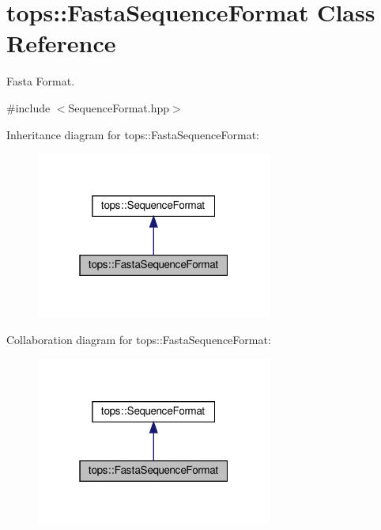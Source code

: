 \hypertarget{classtops_1_1FastaSequenceFormat}{}\section{tops\+:\+:Fasta\+Sequence\+Format Class Reference}
\label{classtops_1_1FastaSequenceFormat}


Fasta Format.  




{\ttfamily \#include $<$Sequence\+Format.\+hpp$>$}



Inheritance diagram for tops\+:\+:Fasta\+Sequence\+Format\+:
\nopagebreak
\begin{figure}[H]
\begin{center}
\leavevmode
\includegraphics[width=220pt]{classtops_1_1FastaSequenceFormat__inherit__graph}
\end{center}
\end{figure}


Collaboration diagram for tops\+:\+:Fasta\+Sequence\+Format\+:
\nopagebreak
\begin{figure}[H]
\begin{center}
\leavevmode
\includegraphics[width=220pt]{classtops_1_1FastaSequenceFormat__coll__graph}
\end{center}
\end{figure}
